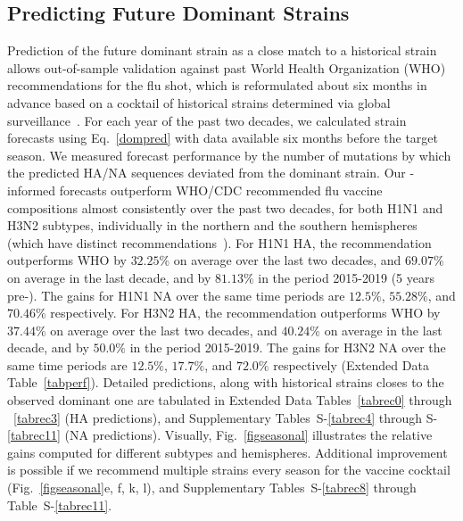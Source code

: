 \documentclass[onecolumn, compsoc,10pt]{IEEEtran}
\def\EXTENDED{Extended Data\xspace}
\def\SUPPLEMENTARY{Supplementary\xspace}
\begin{document}
\subsection*{Predicting Future Dominant Strains}
Prediction of the future dominant strain as  a close match to a historical strain  allows out-of-sample validation against past World Health Organization (WHO) recommendations for the flu shot, which  is  reformulated about six months in advance based on a  cocktail of historical strains determined via global surveillance~\cite{agor2018models}. For each year of the past two decades, we calculated strain forecasts using  Eq.~\eqref{dompred} with data available six months before the target season. We  measured forecast performance by the number of mutations by which the predicted HA/NA  sequences deviated from the  dominant strain. Our \enet-informed forecasts outperform  WHO/CDC recommended flu vaccine compositions almost consistently over the past two decades, for both H1N1 and H3N2 subtypes, individually in the northern and the southern hemispheres (which have distinct recommendations~\cite{boni2008vaccination}). For H1N1 HA, the \enet  recommendation outperforms  WHO  by $32.25\%$ on average over the last two decades, and $69.07\%$ on average in the last decade, and by $81.13\%$ in the period 2015-2019 (5 years pre-\cov). The gains for H1N1 NA over the same time periods are $12.5\%$, $55.28\%$, and $70.46\%$ respectively. For H3N2 HA, the \enet  recommendation outperforms  WHO  by $37.44\%$ on average over the last two decades, and $40.24\%$ on average in the last decade, and by $50.0\%$ in the period 2015-2019. The gains for H3N2 NA over the same time periods are $12.5\%$, $17.7\%$, and $72.0\%$ respectively (\EXTENDED Table~\ref{tabperf}). Detailed predictions, along with historical strains closes to the observed dominant one are tabulated in \EXTENDED Tables~\ref{tabrec0} through ~\ref{tabrec3} (HA predictions), and \SUPPLEMENTARY Tables~S-\ref{tabrec4} through S-\ref{tabrec11} (NA predictions). Visually, Fig.~\ref{figseasonal} illustrates the relative gains computed for different subtypes and hemispheres. Additional improvement is possible if we recommend multiple strains every season for the vaccine cocktail (Fig.~\ref{figseasonal}e, f, k, l), and  \SUPPLEMENTARY  Tables~S-\ref{tabrec8} through  Table~S-\ref{tabrec11}.  %
\end{document}
